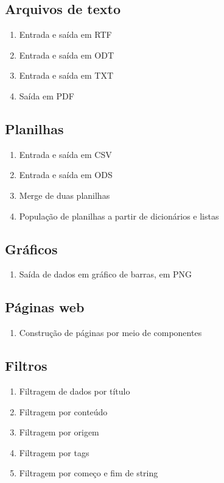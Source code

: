 \subsection{Arquivos de texto}

\begin{enumerate}
\item Entrada e saída em RTF
\item Entrada e saída em ODT
\item Entrada e saída em TXT
\item Saída em PDF
\end{enumerate}

\subsection{Planilhas}
\begin{enumerate}
\item Entrada e saída em CSV
\item Entrada e saída em ODS
\item Merge de duas planilhas
\item População de planilhas a partir de dicionários e listas
\end{enumerate}

\subsection{Gráficos}
\begin{enumerate}
\item Saída de dados em gráfico de barras, em PNG
\end{enumerate}

\subsection{Páginas web}
\begin{enumerate}
\item Construção de páginas por meio de componentes
\end{enumerate}

\subsection{Filtros}
\begin{enumerate}
\item Filtragem de dados por título
\item Filtragem por conteúdo
\item Filtragem por origem
\item Filtragem por tags
\item Filtragem por começo e fim de string
\end{enumerate}

